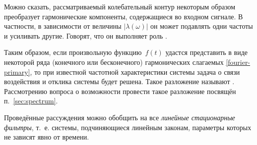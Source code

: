 
Можно сказать, рассматриваемый колебательный контур некоторым образом
преобразует гармонические компоненты, содержащиеся во входном сигнале.
В частности, в зависимости от величины $|\lambda(\omega)|$ 
он может подавлять одни частоты и усиливать другие.
Говорят, что он выполняет роль .

Таким образом, если произвольную функцию~$f(t)$ удастся представить в виде
некоторой ряда (конечного или бесконечного) гармонических слагаемых
\eqref{fourier-primary}, то при известной частотной характеристики системы задача
о связи воздействия и отклика системы будет решена.
Такое разложение называют . Рассмотрению вопроса о возможности 
провести такое разложение посвящён п.~\ref{sec:spectrum}.


%


Проведённые рассуждения можно обобщить на все \emph{линейные стационарные
фильтры}, т.~е. системы, подчиняющиеся линейным законам, параметры которых 
не зависят явно от времени.

